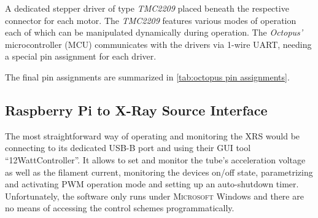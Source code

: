             A dedicated stepper driver of type \textit{TMC2209} placed beneath the respective connector for each motor.
            The \textit{TMC2209} features various modes of operation each of which can be manipulated dynamically during operation.
            The \textit{Octopus'} microcontroller (MCU) communicates with the drivers via 1-wire UART, needing a special pin assignment for each driver.\par\medskip

            The final pin assignments are summarized in \cref{tab:octopus pin assignments}.

        \subsection{Raspberry Pi to X-Ray Source Interface}\label{sec:xrs interface board}
            The most straightforward way of operating and monitoring the XRS would be connecting to its dedicated USB-B port and using their GUI tool ``12WattController''.
            It allows to set and monitor the tube's acceleration voltage as well as the filament current, monitoring the devices on/off state, parametrizing and activating PWM operation mode and setting up an auto-shutdown timer.
            Unfortunately, the software only runs under \textsc{Microsoft} Windows and there are no means of accessing the control schemes programmatically.

